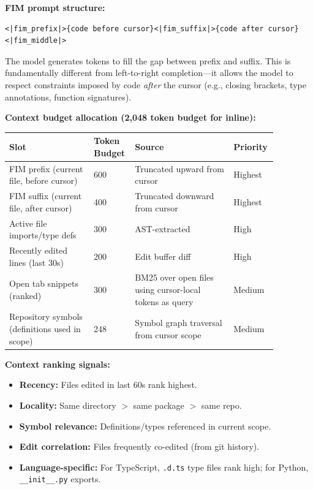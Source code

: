 \textbf{FIM prompt structure:}

\begin{verbatim}
<|fim_prefix|>{code before cursor}<|fim_suffix|>{code after cursor}<|fim_middle|>
\end{verbatim}

The model generates tokens to fill the gap between prefix and suffix. This is fundamentally different from left-to-right completion---it allows the model to respect constraints imposed by code \emph{after} the cursor (e.g., closing brackets, type annotations, function signatures).

\textbf{Context budget allocation (2,048 token budget for inline):}

\begin{tabular}{|p{0.30\linewidth}|p{0.10\linewidth}|p{0.35\linewidth}|p{0.12\linewidth}|}
\hline
\textbf{Slot} & \textbf{Token Budget} & \textbf{Source} & \textbf{Priority} \\
\hline
FIM prefix (current file, before cursor) & 600 & Truncated upward from cursor & Highest \\
\hline
FIM suffix (current file, after cursor) & 400 & Truncated downward from cursor & Highest \\
\hline
Active file imports/type defs & 300 & AST-extracted & High \\
\hline
Recently edited lines (last 30s) & 200 & Edit buffer diff & High \\
\hline
Open tab snippets (ranked) & 300 & BM25 over open files using cursor-local tokens as query & Medium \\
\hline
Repository symbols (definitions used in scope) & 248 & Symbol graph traversal from cursor scope & Medium \\
\hline
\end{tabular}

\textbf{Context ranking signals:}

\begin{itemize}
  \item \textbf{Recency:} Files edited in last 60s rank highest.
  \item \textbf{Locality:} Same directory $>$ same package $>$ same repo.
  \item \textbf{Symbol relevance:} Definitions/types referenced in current scope.
  \item \textbf{Edit correlation:} Files frequently co-edited (from git history).
  \item \textbf{Language-specific:} For TypeScript, \texttt{.d.ts} type files rank high; for Python, \texttt{\_\_init\_\_.py} exports.
\end{itemize}

